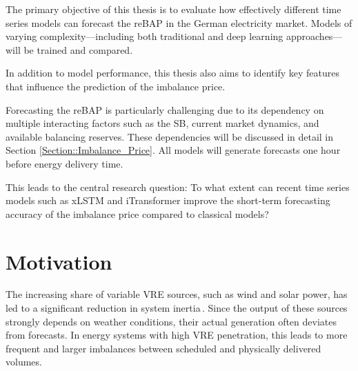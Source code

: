 \documentclass[class=scrbook, crop=false]{standalone}
\begin{document}

The primary objective of this thesis is to evaluate how effectively different time series models can forecast the \gls{reBAP} in the German electricity market. Models of varying complexity—including both traditional and deep learning approaches—will be trained and compared.

In addition to model performance, this thesis also aims to identify key features that influence the prediction of the imbalance price.

Forecasting the \gls{reBAP} is particularly challenging due to its dependency on multiple interacting factors such as the \gls{SB}, current market dynamics, and available balancing reserves. These dependencies will be discussed in detail in Section \ref{Section::Imbalance_Price}. All models will generate forecasts one hour before energy delivery time.

This leads to the central research question: To what extent can recent time series models such as xLSTM and iTransformer improve the short-term forecasting accuracy of the imbalance price compared to classical models?
\section{Motivation}
\label{Section::Motivation}


The increasing share of variable \gls{VRE} sources, such as wind and solar power, has led to a significant reduction in system inertia \cite{weitemeyerIntegrationRenewableEnergy2015}. Since the output of these sources strongly depends on weather conditions, their actual generation often deviates from forecasts. In energy systems with high \gls{VRE} penetration, this leads to more frequent and larger imbalances between scheduled and physically delivered volumes.
\end{document}
